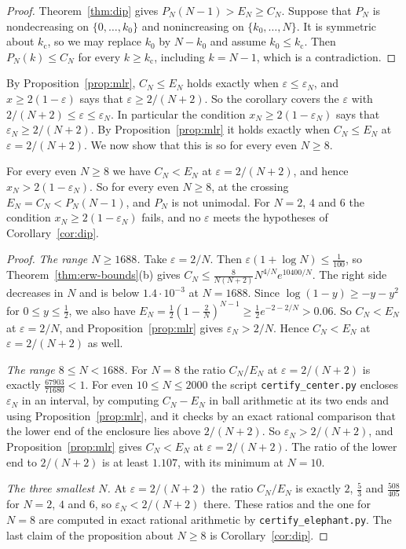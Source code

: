 \begin{proof}
Theorem~\ref{thm:dip} gives $P_N(N-1)>E_N\ge C_N$. Suppose that $P_N$ is
nondecreasing on $\{0,\dots,k_0\}$ and nonincreasing on $\{k_0,\dots,N\}$.
It is symmetric about ${k_{\mathrm c}}$, so we may replace $k_0$ by $N-k_0$ and assume
$k_0\le {k_{\mathrm c}}$. Then $P_N(k)\le C_N$ for every $k\ge {k_{\mathrm c}}$, including $k=N-1$, which
is a contradiction.
\end{proof}

By Proposition~\ref{prop:mlr}, $C_N\le E_N$ holds exactly when
$\varepsilon\le\varepsilon_N$, and $x\ge2(1-\varepsilon)$ says that
$\varepsilon\ge2/(N+2)$. So the corollary covers the $\varepsilon$ with
$2/(N+2)\le\varepsilon\le\varepsilon_N$. In particular the condition
$x_N\ge2(1-\varepsilon_N)$ says that
$\varepsilon_N\ge2/(N+2)$. By Proposition~\ref{prop:mlr} it holds exactly
when $C_N\le E_N$ at $\varepsilon=2/(N+2)$. We now show that this is so for
every even $N\ge8$.

\begin{proposition}\label{prop:dip-hyp}
For every even $N\ge8$ we have $C_N<E_N$ at $\varepsilon=2/(N+2)$, and hence
$x_N>2(1-\varepsilon_N)$. So for every even $N\ge8$, at the crossing
$E_N=C_N<P_N(N-1)$, and $P_N$ is not unimodal. For $N=2$, $4$ and $6$ the
condition $x_N\ge2(1-\varepsilon_N)$ fails, and no $\varepsilon$ meets the hypotheses of
Corollary~\ref{cor:dip}.
\end{proposition}

\begin{proof}
\emph{The range $N\ge1688$.} Take $\varepsilon=2/N$. Then
$\varepsilon(1+\log N)\le\frac1{100}$, so Theorem~\ref{thm:erw-bounds}(b)
gives $C_N\le\frac8{N(N+2)}N^{4/N}e^{10400/N}$. The right side decreases in
$N$ and is below $1.4\cdot10^{-3}$ at $N=1688$. Since $\log(1-y)\ge-y-y^2$
for $0\le y\le\frac12$, we also have
$E_N=\frac12(1-\frac2N)^{N-1}\ge\frac12e^{-2-2/N}>0.06$. So $C_N<E_N$ at
$\varepsilon=2/N$, and Proposition~\ref{prop:mlr} gives $\varepsilon_N>2/N$.
Hence $C_N<E_N$ at $\varepsilon=2/(N+2)$ as well.

\emph{The range $8\le N<1688$.} For $N=8$ the ratio $C_N/E_N$ at
$\varepsilon=2/(N+2)$ is exactly $\frac{67903}{71680}<1$. For even
$10\le N\le2000$ the script \texttt{certify\_center.py} encloses
$\varepsilon_N$ in an interval, by computing $C_N-E_N$ in ball arithmetic at
its two ends and using Proposition~\ref{prop:mlr}, and it checks by an exact rational
comparison that the lower end of the enclosure lies above $2/(N+2)$. So
$\varepsilon_N>2/(N+2)$, and Proposition~\ref{prop:mlr} gives $C_N<E_N$ at
$\varepsilon=2/(N+2)$. The ratio of the lower end to $2/(N+2)$ is at least
$1.107$, with its minimum at $N=10$.

\emph{The three smallest $N$.} At $\varepsilon=2/(N+2)$ the ratio $C_N/E_N$ is
exactly $2$, $\frac53$ and $\frac{508}{405}$ for $N=2$, $4$ and $6$, so
$\varepsilon_N<2/(N+2)$ there. These ratios and the one for $N=8$ are computed
in exact rational arithmetic by \texttt{certify\_elephant.py}. The last claim of the proposition about
$N\ge8$ is Corollary~\ref{cor:dip}.
\end{proof}

